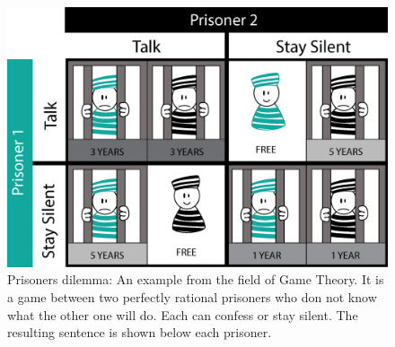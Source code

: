 \begin{figure}[hbtp]
\centering
\includegraphics[scale=0.6]{Images/PrisDilemma}
\caption{Prisoners dilemma: An example from the field of Game Theory. It is a game between two perfectly rational prisoners who don not know what the other one will do. Each can confess or stay silent. The resulting sentence is shown below each prisoner. }
\label{Prison}
\end{figure}



